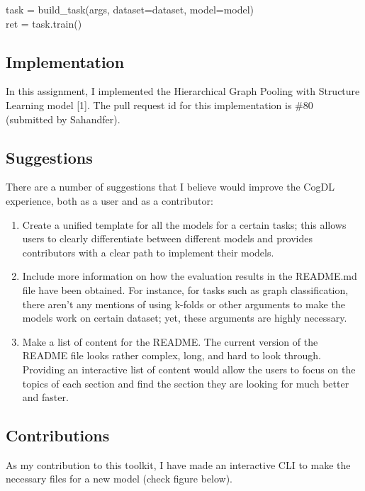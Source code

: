 \documentclass[12pt,a4paper]{article}
\begin{document}
	\vspace{-0.2cm}
	\begin{center}
		task = build\_task(args, dataset=dataset, model=model)\\
		ret = task.train()\\
	\end{center}
	
	\subsection{Implementation}
	
	\noindent In this assignment, I implemented the Hierarchical Graph Pooling with Structure Learning model [1]. The pull request id for this implementation is \#80 (submitted by Sahandfer). 
	
	\subsection{Suggestions}
	\noindent There are a number of suggestions that I believe would improve the CogDL experience, both as a user and as a contributor:
	\begin{enumerate}
		\item Create a unified template for all the models for a certain tasks; this allows users to clearly differentiate between different models and provides contributors with a clear path to implement their models. 
		\item Include more information on how the evaluation results in the README.md file have been obtained. For instance, for tasks such as graph classification, there aren't any mentions of using k-folds or other arguments to make the models work on certain dataset; yet, these arguments are highly necessary.
		\item Make a list of content for the README. The current version of the README file looks rather complex, long, and hard to look through. Providing an interactive list of content would allow the users to focus on the topics of each section and find the section they are looking for much better and faster.
	\end{enumerate}
	
	\subsection{Contributions}
	
	\noindent As my contribution to this toolkit, I have made an interactive CLI to make the necessary files for a new model (check figure below).
	
\end{document}
